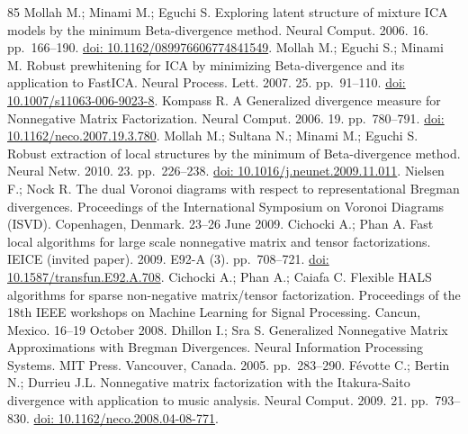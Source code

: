 \begin{thebibliography}{85}
\hypertarget{B68-entropy-12-01532}{} Mollah M.; Minami M.; Eguchi S. Exploring latent structure of mixture ICA models by the minimum Beta-divergence method. Neural Comput. 2006. 16. pp.~166--190. \href{https://doi.org/10.1162/089976606774841549}{doi: 10.1162/089976606774841549}.
\hypertarget{B69-entropy-12-01532}{} Mollah M.; Eguchi S.; Minami M. Robust prewhitening for ICA by minimizing Beta-divergence and its application to FastICA. Neural Process. Lett. 2007. 25. pp.~91--110. \href{https://doi.org/10.1007/s11063-006-9023-8}{doi: 10.1007/s11063-006-9023-8}.
\hypertarget{B70-entropy-12-01532}{} Kompass R. A Generalized divergence measure for Nonnegative Matrix Factorization. Neural Comput. 2006. 19. pp.~780--791. \href{https://doi.org/10.1162/neco.2007.19.3.780}{doi: 10.1162/neco.2007.19.3.780}.
\hypertarget{B71-entropy-12-01532}{} Mollah M.; Sultana N.; Minami M.; Eguchi S. Robust extraction of local structures by the minimum of Beta-divergence method. Neural Netw. 2010. 23. pp.~226--238. \href{https://doi.org/10.1016/j.neunet.2009.11.011}{doi: 10.1016/j.neunet.2009.11.011}.
\hypertarget{B72-entropy-12-01532}{} Nielsen F.; Nock R. The dual Voronoi diagrams with respect to representational Bregman divergences. Proceedings of the International Symposium on Voronoi Diagrams (ISVD). Copenhagen, Denmark. 23–26 June 2009.
\hypertarget{B73-entropy-12-01532}{} Cichocki A.; Phan A. Fast local algorithms for large scale nonnegative matrix and tensor factorizations. IEICE (invited paper). 2009. E92-A (3). pp.~708--721. \href{https://doi.org/10.1587/transfun.E92.A.708}{doi: 10.1587/transfun.E92.A.708}.
\hypertarget{B74-entropy-12-01532}{} Cichocki A.; Phan A.; Caiafa C. Flexible HALS algorithms for sparse non-negative matrix/tensor factorization. Proceedings of the 18th IEEE workshops on Machine Learning for Signal Processing. Cancun, Mexico. 16–19 October 2008.
\hypertarget{B75-entropy-12-01532}{} Dhillon I.; Sra S. Generalized Nonnegative Matrix Approximations with Bregman Divergences. Neural Information Processing Systems. MIT Press. Vancouver, Canada. 2005. pp.~283--290.
\hypertarget{B76-entropy-12-01532}{} Févotte C.; Bertin N.; Durrieu J.L. Nonnegative matrix factorization with the Itakura-Saito divergence with application to music analysis. Neural Comput. 2009. 21. pp.~793--830. \href{https://doi.org/10.1162/neco.2008.04-08-771}{doi: 10.1162/neco.2008.04-08-771}.

\end{thebibliography}
